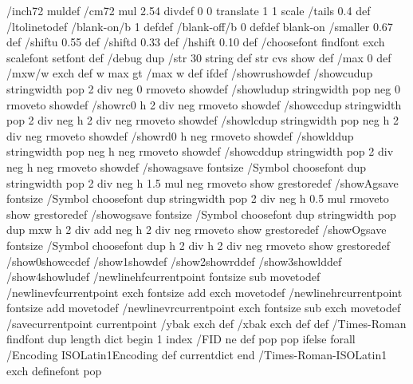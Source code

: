 /inch{72 mul}def /cm{72 mul 2.54 div}def 0 0 translate  1 1 scale
/tails 0.4 def %
/lto{lineto}def %
/blank-on{/b 1 def}def /blank-off{/b 0 def}def blank-on
/smaller 0.67 def %
/shiftu  0.55 def %
/shiftd  0.33 def %
/hshift  0.10 def %
/choosefont {findfont exch scalefont setfont} def
/debug {dup /str 30 string def str cvs show} def
/max 0 def /mxw{/w exch def w max gt {/max w def} if}def
/showru{show}def
/showcu{dup stringwidth pop 2 div neg 0 rmoveto show}def
/showlu{dup stringwidth pop neg 0 rmoveto show}def
/showrc{0 h 2 div neg rmoveto show}def
/showcc{dup stringwidth pop 2 div neg h 2 div neg rmoveto show}def
/showlc{dup stringwidth pop neg h 2 div neg rmoveto show}def
/showrd{0 h neg rmoveto show}def
/showld{dup stringwidth pop neg h neg rmoveto show}def
/showcd{dup stringwidth pop 2 div neg h neg rmoveto show}def
/showa{gsave fontsize /Symbol choosefont
       dup stringwidth pop 2 div neg h 1.5 mul neg rmoveto show grestore}def
/showA{gsave fontsize /Symbol choosefont
       dup stringwidth pop 2 div neg h 0.5 mul rmoveto show grestore}def
/showo{gsave fontsize /Symbol choosefont
       dup stringwidth pop dup mxw h 2 div add neg h 2 div neg rmoveto show grestore}def
/showO{gsave fontsize /Symbol choosefont
       dup h 2 div h 2 div neg rmoveto show grestore}def
/show0{showcc}def /show1{show}def /show2{showrd}def /show3{showld}def
/show4{showlu}def
/newlinehf{currentpoint fontsize sub moveto}def
/newlinevf{currentpoint exch fontsize add exch moveto}def
/newlinehr{currentpoint fontsize add moveto}def
/newlinevr{currentpoint exch fontsize sub exch moveto}def
/savecurrentpoint {currentpoint /ybak exch def /xbak exch def} def
/Times-Roman findfont
dup length dict begin
   {1 index /FID ne {def} {pop pop} ifelse} forall
   /Encoding ISOLatin1Encoding def
   currentdict
end
/Times-Roman-ISOLatin1 exch definefont pop

